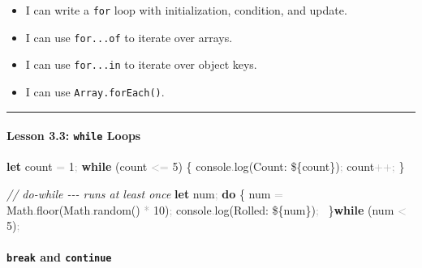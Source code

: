 \documentclass[
  justified,
  openright,
]{tufte-book}
\let\subsection\paragraph
\let\paragraph\paragraph
\newcommand{\KeywordTok}[1]{\textcolor{CodeKeyword}{\textbf{#1}}}  %
\newcommand{\StringTok}[1]{\textcolor{CodeString}{#1}}              %
\newcommand{\CommentTok}[1]{\textcolor{CodeComment}{\textit{#1}}}  %
\newcommand{\CodeNumTok}[1]{\textcolor{CodeNumber}{#1}}             %
\newcommand{\CodeFuncTok}[1]{\textcolor{CodeKeyword}{#1}}           %
\newcommand{\OperatorTok}[1]{\textcolor{DarkGray}{#1}}              %
\newenvironment{Shaded}{%
  \begin{mdframed}[style=TufteCode]%
}{%
  \end{mdframed}%
}
\let\subsection\paragraph
\let\paragraph\paragraph
\providecommand{\tightlist}{%
  \setlength{\itemsep}{0pt}\setlength{\parskip}{0pt}}
\begin{document}
\begin{itemize}
\tightlist
\item[$\square$]
  I can write a \texttt{for} loop with initialization, condition, and
  update.
\item[$\square$]
  I can use \texttt{for...of} to iterate over arrays.
\item[$\square$]
  I can use \texttt{for...in} to iterate over object keys.
\item[$\square$]
  I can use \texttt{Array.forEach()}.
\end{itemize}

\begin{center}\rule{0.5\linewidth}{0.5pt}\end{center}

\subsection{\texorpdfstring{Lesson 3.3: \texttt{while}
Loops}{Lesson 3.3: while Loops}}\label{lesson-3.3-while-loops}

\begin{Shaded}
\begin{Highlighting}[]
\KeywordTok{let} count \OperatorTok{=} \CodeNumTok{1}\OperatorTok{;}
\KeywordTok{while} (count \OperatorTok{\textless{}=} \CodeNumTok{5}) \{
  console\OperatorTok{.}\CodeFuncTok{log}(\StringTok{\textasciigrave{}Count: }\StringTok{\$\{}count\StringTok{\}}\StringTok{\textasciigrave{}})\OperatorTok{;}
  count\OperatorTok{++;}
\}
 
\CommentTok{// do{-}while {-}{-}{-} runs at least once}
\KeywordTok{let} num\OperatorTok{;}
\KeywordTok{do} \{
  num \OperatorTok{=} Math\OperatorTok{.}\CodeFuncTok{floor}(Math\OperatorTok{.}\CodeFuncTok{random}() \OperatorTok{*} \CodeNumTok{10})\OperatorTok{;}
  console\OperatorTok{.}\CodeFuncTok{log}(\StringTok{\textasciigrave{}Rolled: }\StringTok{\$\{}num\StringTok{\}}\StringTok{\textasciigrave{}})\OperatorTok{;}
\ \}\KeywordTok{while} (num \OperatorTok{\textless{}} \CodeNumTok{5})\OperatorTok{;}
\end{Highlighting}
\end{Shaded}

\subsection{\texorpdfstring{\texttt{break} and
\texttt{continue}}{break and continue}}\label{break-and-continue}
\end{document}
